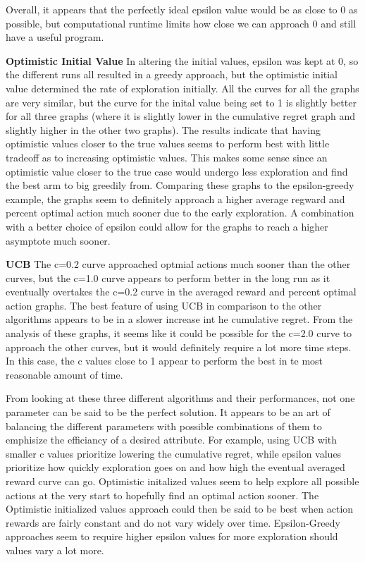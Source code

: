 \documentclass[11pt]{article}
\begin{document}
Overall, it appears that the perfectly ideal epsilon value would be as close to 0 as possible, but computational runtime limits how close we can approach 0 and still have a useful program.

\textbf{Optimistic Initial Value}
In altering the initial values, epsilon was kept at 0, so the different runs all resulted in a greedy approach, but the optimistic initial value determined the rate of exploration initially. All the curves for all the graphs are very similar, but the curve for the inital value being set to 1 is slightly better for all three graphs (where it is slightly lower in the cumulative regret graph and slightly higher in the other two graphs). The results indicate that having optimistic values closer to the true values seems to perform best with little tradeoff as to increasing optimistic values. This makes some sense since an optimistic value closer to the true case would undergo less exploration and find the best arm to big greedily from. Comparing these graphs to the epsilon-greedy example, the graphs seem to definitely approach a higher average regward and percent optimal action much sooner due to the early exploration. A combination with a better choice of epsilon could allow for the graphs to reach a higher asymptote much sooner.

\textbf{UCB}
The c=0.2 curve approached optmial actions much sooner than the other curves, but the c=1.0 curve appears to perform better in the long run as it eventually overtakes the c=0.2 curve in the averaged reward and percent optimal action graphs. The best feature of using UCB in comparison to the other algorithms appears to be in a slower increase int he cumulative regret. From the analysis of these graphs, it seems like it could be possible for the c=2.0 curve to approach the other curves, but it would definitely require a lot more time steps. In this case, the c values close to 1 appear to perform the best in te most reasonable amount of time.

From looking at these three different algorithms and their performances, not one parameter can be said to be the perfect solution. It appears to be an art of balancing the different parameters with possible combinations of them to emphisize the efficiancy of a desired attribute. For example, using UCB with smaller c values prioritize lowering the cumulative regret, while epsilon values prioritize how quickly exploration goes on and how high the eventual averaged reward curve can go. Optimistic initalized values seem to help explore all possible actions at the very start to hopefully find an optimal action sooner. The Optimistic initialized values approach could then be said to be best when action rewards are fairly constant and do not vary widely over time. Epsilon-Greedy approaches seem to require higher epsilon values for more exploration should values vary a lot more.
\end{document}
